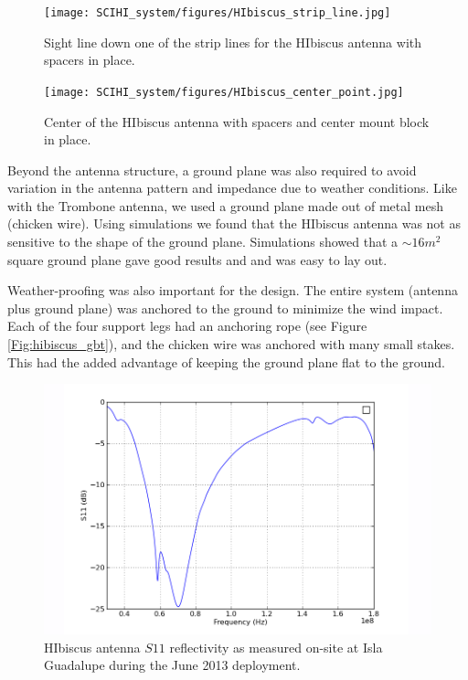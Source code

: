 \begin{figure}[htb]
\centering
\begin{minipage}[b]{0.52\textwidth}
\centering
\texttt{[image: SCIHI\_system/figures/HIbiscus\_strip\_line.jpg]}
\caption{Sight line down one of the strip lines for the HIbiscus antenna with spacers in place.}
\label{Fig:hibiscus_spacer}
\end{minipage}%
\begin{minipage}[b]{0.02\textwidth}
\hspace{1cm}
\end{minipage}%
\begin{minipage}[b]{0.43\textwidth}
\centering
\texttt{[image: SCIHI\_system/figures/HIbiscus\_center\_point.jpg]}
\caption{Center of the HIbiscus antenna with spacers and center mount block in place.}
\label{Fig:hibiscus_center}
\end{minipage}
\end{figure}

Beyond the antenna structure, a ground plane was also required to avoid variation in the antenna pattern and impedance due to weather conditions. Like with the Trombone antenna, we used a ground plane made out of metal mesh (chicken wire). Using simulations we found that the HIbiscus antenna was not as sensitive to the shape of the ground plane. Simulations showed that a $\sim16 m^2$ square ground plane gave good results and and was easy to lay out. 

Weather-proofing was also important for the design. The entire system (antenna plus ground plane) was anchored to the ground to minimize the wind impact. Each of the four support legs had an anchoring rope (see Figure \ref{Fig:hibiscus_gbt}), and the chicken wire was anchored with many small stakes. This had the added advantage of keeping the ground plane flat to the ground. 

\begin{figure}[htb]
\centering
\includegraphics[width=0.8\linewidth]{SCIHI_system/figures/HIbiscus_S11_dB_70MHz.png}
\caption{HIbiscus antenna $S11$ reflectivity as measured on-site at Isla Guadalupe during the June 2013 deployment. }
\label{Fig:HIS11_dB_70}
\end{figure}

